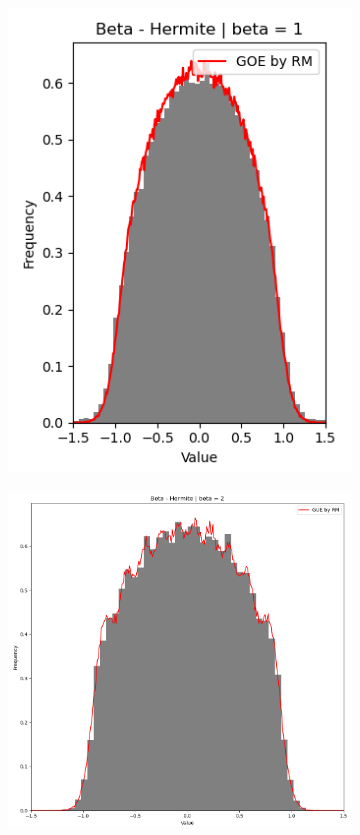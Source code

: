 \documentclass[12pt]{report}
\begin{document}
\begin{figure}
	\begin{center}
			\begin{subfigure}{.6\textwidth}
			\centering
			\includegraphics[width=0.7\linewidth]{Assets/b1WT}
			\caption{}
			\label{fig:art1}
		\end{subfigure}%
	\end{center}
	\begin{subfigure}{.5\textwidth}
		\centering
		\includegraphics[width=.9\linewidth]{Assets/b2WT}

\end{subfigure}
\end{figure}
\end{document}
